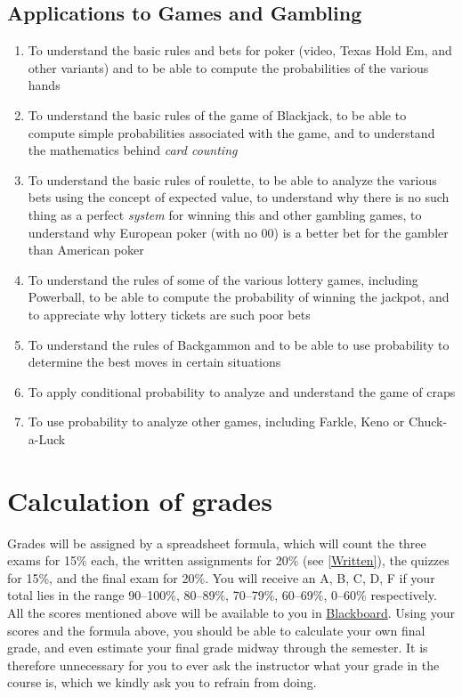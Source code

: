 \documentclass[11pt]{article}
\begin{document}
\subsection{Applications to Games and Gambling}
\begin{enumerate}
\item To understand the basic rules and bets for poker
(video, Texas Hold Em, and other variants)
and to be able to compute the probabilities of the various hands
\item To understand the basic rules of the game of Blackjack,
to be able to compute simple probabilities associated with the game,
and to understand the mathematics behind {\em card counting}
\item To understand the basic rules of roulette,
to be able to analyze the various bets using the concept of expected value,
to understand why there is no such thing as a perfect {\em system}
for winning this and other gambling games,
to understand why European poker (with no 00)
is a better bet for the gambler than American poker
\item To understand the rules of some of the various lottery games,
including Powerball,
to be able to compute the probability of winning the jackpot,
and to appreciate why lottery tickets are such poor bets
\item To understand the rules of Backgammon and to be able to use
probability to determine the best moves in certain situations
\item To apply conditional probability to analyze
and understand the game of craps
\item To use probability to analyze other games,
including Farkle, Keno or Chuck-a-Luck
\end{enumerate}

\section{Calculation of grades}\label{Assessment}
Grades will be assigned by a spreadsheet formula, which will count
the three exams for 15\% each,
the written assignments for 20\% (see \autoref{Written}),
the quizzes for 15\%, and the final exam for 20\%.
You will receive an A, B, C, D, F if your total lies in the range
90--100\%, 80--89\%, 70--79\%, 60--69\%, 0--60\% respectively.
All the scores mentioned above will be available to you in
\href{https://bb.its.iastate.edu}{Blackboard}. Using your scores
and the formula above, you should be able to calculate your own final grade,
and even estimate your final grade midway through the semester.
It is therefore unnecessary for you to ever ask the instructor
what your grade in the course is, which we kindly ask you to refrain from
doing.
\end{document}

